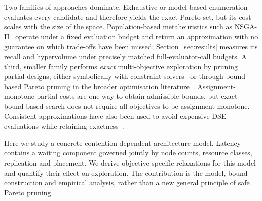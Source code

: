 \documentclass[preprint,11pt,3p]{elsarticle}
\theoremstyle{plain}
\theoremstyle{definition}
\begin{document}
Two families of approaches dominate. Exhaustive or model-based enumeration evaluates
every candidate and therefore yields the exact Pareto set, but its cost scales with the
size of the space. Population-based metaheuristics such as NSGA-II~\cite{deb2002nsga2}
operate under a fixed evaluation budget and return an approximation with no guarantee on
which trade-offs have been missed; Section~\ref{sec:results} measures its recall and hypervolume under precisely matched full-evaluator-call budgets. A third, smaller family performs \emph{exact}
multi-objective exploration by pruning partial designs, either symbolically with
constraint solvers~\cite{neubauer2018exact,haubelt2018asp} or through bound-based Pareto
pruning in the broader optimisation literature~\cite{paretopruning2022,mandow2010namoa}.
Assignment-monotone partial costs are one way to obtain admissible bounds,
but exact bound-based search does not require all objectives to be assignment
monotone. Consistent approximations have also been used to avoid expensive
DSE evaluations while retaining exactness~\cite{neubauer2020consistent}.

Here we study a concrete contention-dependent architecture model. Latency
contains a waiting component governed jointly by node counts, resource classes,
replication and placement. We derive objective-specific relaxations for this
model and quantify their effect on exploration. The contribution is the model,
bound construction and empirical analysis, rather than a new general principle
of safe Pareto pruning.
\end{document}
